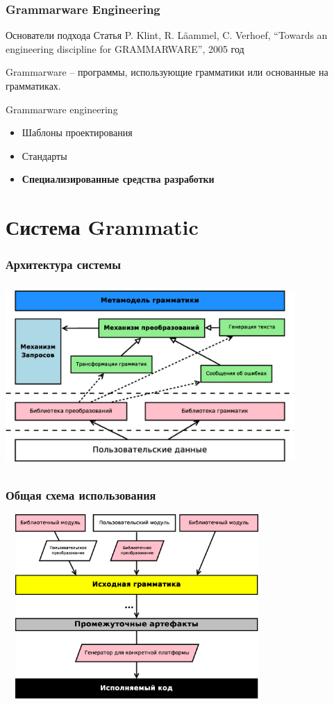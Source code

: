 \documentclass[paper=screen,10pt,unicode]{beamer}
\begin{document}
\begin{frame}
	\frametitle{Grammarware Engineering}

	\begin{block}{Основатели подхода}
		Статья P. Klint, R. L\"{a}ammel, C. Verhoef, ``Towards an engineering discipline for GRAMMARWARE'', 2005 год
	\end{block}
	\begin{block}{}
		\alert{Grammarware} -- программы, использующие грамматики или основанные на грамматиках.
	\end{block}
	\begin{block}{Grammarware engineering}
		\begin{itemize}
			\item Шаблоны проектирования
			\item Стандарты
			\item {\bf Специализированные средства разработки }
		\end{itemize}
	\end{block}
\end{frame}

\section{Система Grammatic}

\begin{frame}
	\frametitle{Архитектура системы}
	\includegraphics[width=110mm,height=70mm]{grammatic_structure.eps}	
\end{frame}

\begin{frame}
	\frametitle{Общая схема использования}
	\begin{center}
 		\includegraphics[width=100mm,height=70mm]{grammatic_usage.eps}	
	\end{center}
\end{frame}
\end{document}
